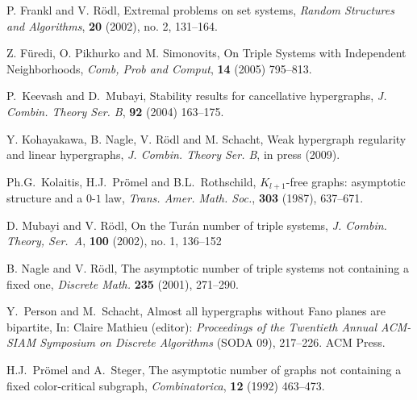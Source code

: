 \documentclass[11pt]{article}
\begin{document}
\begin{thebibliography}{99}
 P. Frankl and V. R\"odl, Extremal problems on set systems,  {\em Random Structures and Algorithms},  {\bf 20}  (2002),
no. 2, 131--164.

 Z. F\"uredi, O. Pikhurko and M. Simonovits, On Triple Systems with Independent Neighborhoods,
 {\em Comb, Prob and Comput}, {\bf 14} (2005) 795--813.


P.~Keevash and D.~Mubayi,
 Stability results for cancellative hypergraphs,
 {\em J. Combin. Theory Ser. B}, {\bf 92} (2004) 163--175.

Y. Kohayakawa, B. Nagle, V. R\"odl and M. Schacht, Weak hypergraph regularity and linear hypergraphs, {\em J.
Combin. Theory Ser. B}, in press (2009).

 Ph.G.~Kolaitis, H.J.~Pr\"omel and B.L.~Rothschild, $K_{l+1}$-free graphs:
asymptotic structure and a $0$-$1$ law, {\em Trans. Amer. Math.
Soc.},  {\bf 303} (1987), 637--671.


 D. Mubayi and V. R\"odl, On the Tur\'an    number of triple systems, {\em J.  Combin. Theory, Ser.~A}, {\bf 100} (2002), no. 1, 136--152


 B. Nagle and V. R\"odl, The asymptotic number of triple systems not containing a fixed one,
 {\em Discrete Math.} {\bf 235} (2001), 271--290.

 Y.~Person and M.~Schacht, Almost all hypergraphs without Fano planes are bipartite,
In: Claire Mathieu (editor): {\em Proceedings of the Twentieth Annual ACM-SIAM Symposium on Discrete Algorithms}
 (SODA 09), 217--226. ACM Press.

 H.J.~Pr\"omel and A.~Steger, The asymptotic number of graphs
not containing a fixed color-critical subgraph,
  {\em Combinatorica},  {\bf 12} (1992) 463--473.
\end{thebibliography}
\end{document}
